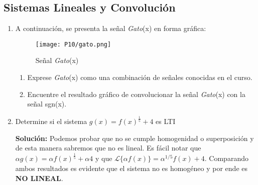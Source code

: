 \documentclass[letterpaper, 12pt]{article}
\newif\ifanswers
\begin{document}
\subsection*{Sistemas Lineales y Convolución}



\begin{enumerate}



    \item A continuación, se presenta la señal \emph{Gato}(x) en forma gráfica:
    \begin{figure}[H]
        \centering
        \texttt{[image: P10/gato.png]}
        \caption{Señal \emph{Gato}(x)}
        \label{gato}
    \end{figure}

    \begin{enumerate}
        \item Exprese \emph{Gato}(x) como una combinación de señales conocidas en el curso.
        \item Encuentre el resultado gráfico de convolucionar la señal \emph{Gato}(x) con la señal sgn(x).
    \end{enumerate}

    \ifanswers
    {\color{red} \textbf{Solución:}

    Una posible solución consiste en considerar:
    \begin{align*}
        \emph{Gato}(x) &= \sqcap \left(\frac{x-5}{8}\right)+ \sqcap \left(\frac{x-5}{6}\right)+\wedge \left(2(x-2.5)\right)+\wedge \left(2(x-3.5)\right)+\sqcap \left(\frac{x-10.5}{3}\right) \left( 4-\frac{x}{3} \right)
    \end{align*}

    Al convolucionar la señal \emph{Gato}(x) con la señal sgn(x), se tendrá el siguiente gráfico:
    \begin{figure}[H]
        \centering
        \texttt{[image: P10/sol\_gato.png]}
        \caption{Resultado de convolución}
        \label{gato-sol}
    \end{figure}}

    \fi

    \item Determine si el sistema $g(x) = f(x)^{\frac{1}{5}} + 4$ es LTI

    
    \ifanswers
    {\color{red} \textbf{Solución:}
     Podemos probar que no se cumple homogenidad o superposición y de esta manera sabremos que no es lineal. Es fácil notar que $\alpha g(x) = \alpha f(x)^{\frac{1}{5}} + \alpha 4 $ y que $\mathcal{L}\{ \alpha f(x) \} = \alpha^{1/5}f(x) + 4$. Comparando ambos resultados es evidente que el sistema no es homogéneo y por ende es \textbf{NO LINEAL}.}
        

\end{enumerate}
\end{document}
